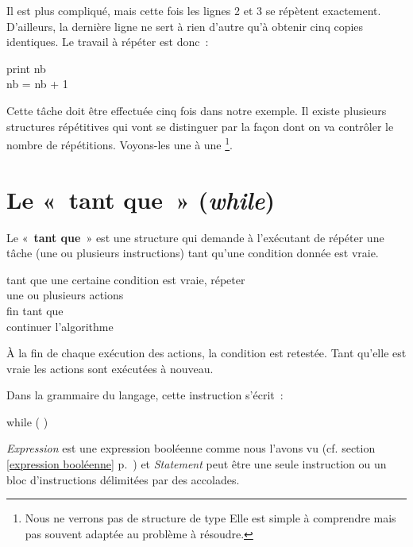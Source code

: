 		Il est plus compliqué, mais cette fois les lignes 2 et 3 se répètent
		exactement.  D’ailleurs, la dernière ligne ne sert à rien d’autre qu’à
		obtenir cinq copies identiques.  Le travail à répéter est donc~:

		\begin{langagenaturel}
			print nb\\
			nb = nb + 1
		\end{langagenaturel}

		Cette tâche doit être effectuée cinq fois dans notre exemple.
		Il existe plusieurs structures répétitives
		qui vont se distinguer par la façon dont on va
		contrôler le nombre de répétitions.
		Voyons-les une à une%
		\footnote{%
			Nous ne verrons pas de structure de type
			Elle est simple à comprendre
			mais pas souvent adaptée au problème à résoudre.
		}.

\clearpage
\section{Le «~tant que~» (\textit{while})}
	
	Le «~\textbf{tant que}~» est une structure qui demande à l’exécutant de
	répéter une tâche (une ou plusieurs instructions) tant qu’une condition
	donnée est vraie.
	
	\begin{langagenaturel}
		tant que une certaine condition est vraie, répeter\\
			\tab une ou plusieurs actions\\
		fin tant que\\
		continuer l'algorithme 
	\end{langagenaturel}

	À la fin de chaque exécution des actions, la condition est retestée. Tant
	qu'elle est vraie les actions sont exécutées à nouveau. 

	Dans la grammaire du langage, cette instruction s'écrit~:
	
	\begin{grammaire}
		while (  )
	\end{grammaire}
	
	\textit{Expression} est une expression booléenne comme nous l'avons vu (cf.
	section \ref{expression booléenne} p.~\pageref{expression booléenne}) et
	\textit{Statement} peut être une seule instruction ou un bloc
	d'instructions délimitées par des accolades.
	
